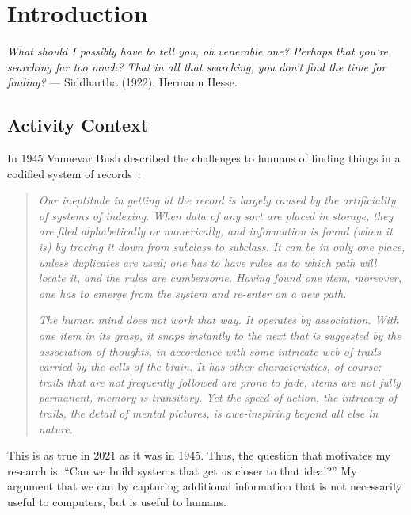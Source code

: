 
\chapter{Introduction}
\label{ch:introduction}

\begin{epigraph}
    \emph{
        What should I possibly have to tell you, oh venerable one? Perhaps that you're searching far too much? That in all that searching, you don't find the time for finding?
    } --- Siddhartha (1922), Hermann Hesse.
\end{epigraph}

\section{Activity Context}
\label{ch:introduction:sec:activitycontext}

In 1945 Vannevar Bush described the challenges to humans of
finding things in a codified system of records~\cite{bush1945we}:

\begin{quotation}
    \emph{Our ineptitude in getting at the record is largely
        caused by the artificiality of systems of indexing. When data of any
        sort are placed in storage, they are filed alphabetically or numerically, and
        information is found (when it is) by tracing it down from subclass to
        subclass. It can be in only one place, unless duplicates are used; one
        has to have rules as to which path will locate it, and the rules are
        cumbersome. Having found one item, moreover, one has to emerge from the
        system and re-enter on a new path.}

    \emph{
        The human mind does not work that way. It operates by association. With one
        item in its grasp, it snaps instantly to the next that is suggested by the
        association of thoughts, in accordance with some intricate web of trails
        carried by the cells of the brain. It has other characteristics, of course;
        trails that are not frequently followed are prone to fade, items are not
        fully permanent, memory is transitory. Yet the speed of action, the
        intricacy of trails, the detail of mental pictures, is awe-inspiring beyond
        all else in nature.}
\end{quotation}

This is as true in 2021 as it was in 1945.  Thus, the question that motivates my
research is: ``Can we build systems that get us closer to that ideal?''  My
argument that we can by capturing additional information that is not necessarily
useful to computers, but is useful to humans.

